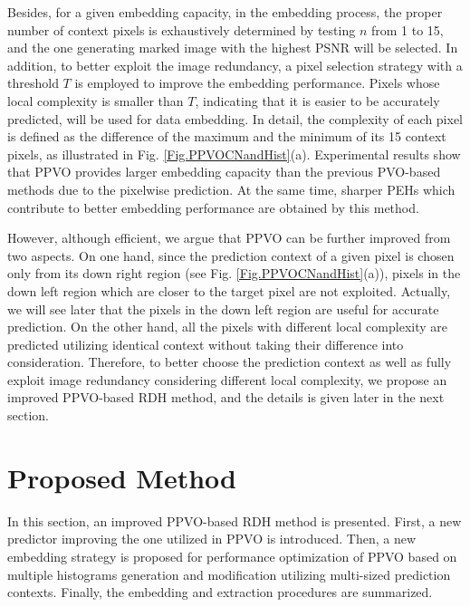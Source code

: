 \documentclass[review,3p,10pt,sort&compress]{elsarticle}
\begin{document}
Besides, for a given embedding capacity, in the embedding process, the proper number of context pixels is exhaustively determined by testing $n$ from 1 to 15, and the one generating marked image with the highest PSNR will be selected. In addition, to better exploit the image redundancy, a pixel selection strategy with a threshold $T$ is employed to improve the embedding performance. Pixels whose local complexity is smaller than $T$, indicating that it is easier to be accurately predicted, will be used for data embedding. In detail, the complexity of each pixel is defined as the difference of the maximum and the minimum of its 15 context pixels, as illustrated in Fig. \ref{Fig.PPVOCNandHist}(a). Experimental results show that PPVO provides larger embedding capacity than the previous PVO-based methods \cite{Li2013PVO,Peng2014IPVO} due to the pixelwise prediction. At the same time, sharper PEHs which contribute to better embedding performance are obtained by this method.

However, although efficient, we argue that PPVO can be further improved from two aspects. On one hand, since the prediction context of a given pixel is chosen only from its down right region (see Fig. \ref{Fig.PPVOCNandHist}(a)), pixels in the down left region which are closer to the target pixel are not exploited. Actually, we will see later that the pixels in the down left region are useful for accurate prediction. On the other hand, all the pixels with different local complexity are predicted utilizing identical context without taking their difference into consideration. Therefore, to better choose the prediction context as well as fully exploit image redundancy considering different local complexity, we propose an improved PPVO-based RDH method, and the details is given later in the next section.

\section{Proposed Method}\label{sec:3}
In this section, an improved PPVO-based RDH method is presented. First, a new predictor improving the one utilized in PPVO \cite{Qu2015PPVO} is introduced. Then, a new embedding strategy is proposed for performance optimization of PPVO based on multiple histograms generation and modification utilizing multi-sized prediction contexts. Finally, the embedding and extraction procedures are summarized.
\end{document}
